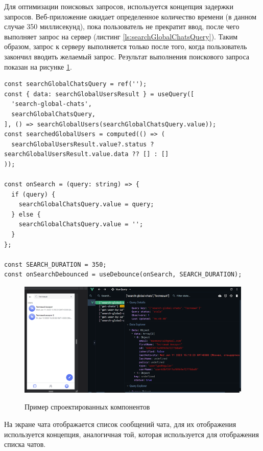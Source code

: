 Для оптимизации поисковых запросов, используется концепция задержки запросов. Веб-приложение ожидает определенное количество времени (в данном случае 350 миллисекунд), пока пользователь не прекратит ввод, после чего выполняет запрос на сервер (листинг \ref{ls:searchGlobalChatsQuery}). Таким образом, запрос к серверу выполняется только после того, когда пользователь закончил вводить желаемый запрос. Результат выполнения поискового запроса показан на рисунке \ref{fig:web-app-search-query}.

\begin{lstlisting}[caption={Использование TanStack Query для запросов на сервер с задержкой}, label={ls:searchGlobalChatsQuery}]
const searchGlobalChatsQuery = ref('');
const { data: searchGlobalUsersResult } = useQuery([
  'search-global-chats',
  searchGlobalChatsQuery,
], () => searchGlobalUsers(searchGlobalChatsQuery.value));
const searchedGlobalUsers = computed(() => (
  searchGlobalUsersResult.value?.status ? searchGlobalUsersResult.value.data ?? [] : []
));

const onSearch = (query: string) => {
  if (query) {
    searchGlobalChatsQuery.value = query;
  } else {
    searchGlobalChatsQuery.value = '';
  }
};

const SEARCH_DURATION = 350;
const onSearchDebounced = useDebounce(onSearch, SEARCH_DURATION);
\end{lstlisting}

\begin{figure}[H]
\begin{center}
\includegraphics[width=1.0\hsize]{fig/web-app-search-query.png}\\[2mm]
\caption{Пример спроектированных компонентов}\label{fig:web-app-search-query}
\end{center}
\end{figure}

На экране чата отображается список сообщений чата, для их отображения используется концепция, аналогичная той, которая используется для отображения списка чатов.

